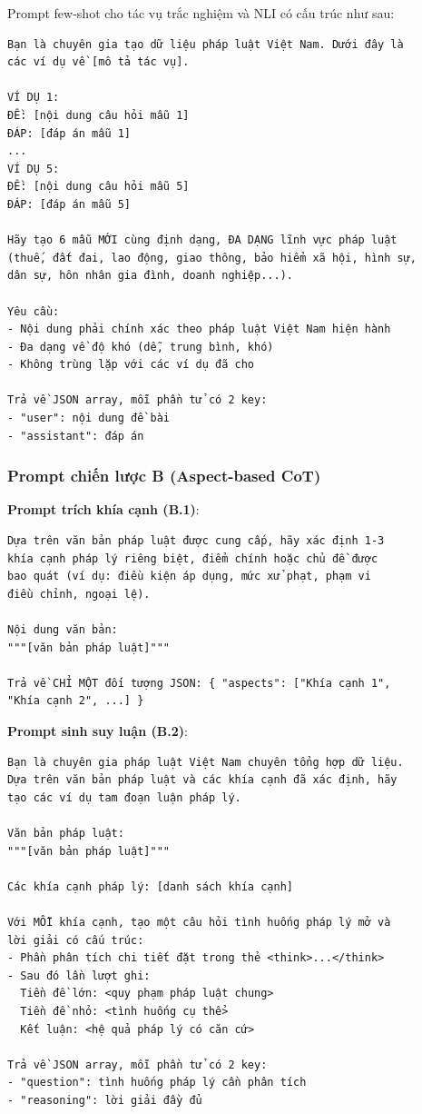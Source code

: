 Prompt few-shot cho tác vụ trắc nghiệm và NLI có cấu trúc như sau:

\begin{verbatim}
Bạn là chuyên gia tạo dữ liệu pháp luật Việt Nam. Dưới đây là
các ví dụ về [mô tả tác vụ].

VÍ DỤ 1:
ĐỀ: [nội dung câu hỏi mẫu 1]
ĐÁP: [đáp án mẫu 1]
...
VÍ DỤ 5:
ĐỀ: [nội dung câu hỏi mẫu 5]
ĐÁP: [đáp án mẫu 5]

Hãy tạo 6 mẫu MỚI cùng định dạng, ĐA DẠNG lĩnh vực pháp luật
(thuế, đất đai, lao động, giao thông, bảo hiểm xã hội, hình sự,
dân sự, hôn nhân gia đình, doanh nghiệp...).

Yêu cầu:
- Nội dung phải chính xác theo pháp luật Việt Nam hiện hành
- Đa dạng về độ khó (dễ, trung bình, khó)
- Không trùng lặp với các ví dụ đã cho

Trả về JSON array, mỗi phần tử có 2 key:
- "user": nội dung đề bài
- "assistant": đáp án
\end{verbatim}

\subsubsection{Prompt chiến lược B (Aspect-based CoT)}

\textbf{Prompt trích khía cạnh (B.1)}:
\begin{verbatim}
Dựa trên văn bản pháp luật được cung cấp, hãy xác định 1-3
khía cạnh pháp lý riêng biệt, điểm chính hoặc chủ đề được
bao quát (ví dụ: điều kiện áp dụng, mức xử phạt, phạm vi
điều chỉnh, ngoại lệ).

Nội dung văn bản:
"""[văn bản pháp luật]"""

Trả về CHỈ MỘT đối tượng JSON: { "aspects": ["Khía cạnh 1",
"Khía cạnh 2", ...] }
\end{verbatim}

\textbf{Prompt sinh suy luận (B.2)}:
\begin{verbatim}
Bạn là chuyên gia pháp luật Việt Nam chuyên tổng hợp dữ liệu.
Dựa trên văn bản pháp luật và các khía cạnh đã xác định, hãy
tạo các ví dụ tam đoạn luận pháp lý.

Văn bản pháp luật:
"""[văn bản pháp luật]"""

Các khía cạnh pháp lý: [danh sách khía cạnh]

Với MỖI khía cạnh, tạo một câu hỏi tình huống pháp lý mở và
lời giải có cấu trúc:
- Phần phân tích chi tiết đặt trong thẻ <think>...</think>
- Sau đó lần lượt ghi:
  Tiền đề lớn: <quy phạm pháp luật chung>
  Tiền đề nhỏ: <tình huống cụ thể>
  Kết luận: <hệ quả pháp lý có căn cứ>

Trả về JSON array, mỗi phần tử có 2 key:
- "question": tình huống pháp lý cần phân tích
- "reasoning": lời giải đầy đủ
\end{verbatim}

